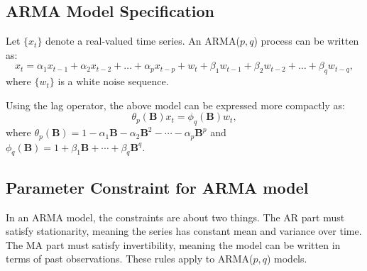 \documentclass[12pt,a4paper]{article}
\begin{document}
\subsection{ARMA Model Specification}

Let $\{x_t\}$ denote a real-valued time series. An ARMA($p,q$) process can be written as:
\begin{equation}
	x_t = \alpha_1 x_{t-1} + \alpha_2 x_{t-2} + \dots + \alpha_p x_{t-p} + w_t + \beta_1 w_{t-1} + \beta_2 w_{t-2} + \dots + \beta_q w_{t-q},
	\label{eq:arma}
\end{equation}
where $\{w_t\}$ is a white noise sequence.

Using the lag operator, the above model can be expressed more compactly as:
\begin{equation}
	\theta_p(\mathbf{B}) x_t = \phi_q(\mathbf{B}) w_t,
	\label{eq:arma_polynomial}
\end{equation}
where $\theta_p(\mathbf{B}) = 1 - \alpha_1 \mathbf{B} - \alpha_2 \mathbf{B}^2 - \cdots - \alpha_p \mathbf{B}^p$ and $\phi_q(\mathbf{B}) = 1 + \beta_1 \mathbf{B} + \cdots + \beta_q \mathbf{B}^q$.

\subsection{Parameter Constraint for ARMA model}
In an ARMA model, the constraints are about two things. The AR part must satisfy stationarity, meaning the series has constant mean and variance over time. The MA part must satisfy invertibility, meaning the model can be written in terms of past observations. These rules apply to ARMA($p,q$) models. 
\end{document}
